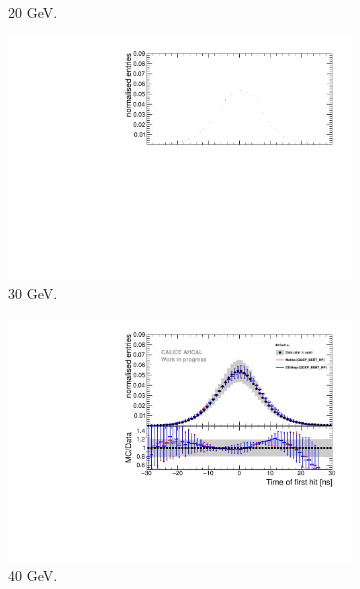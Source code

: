 \begin{figure}[htbp!]
\begin{subfigure}[t]{0.5\textwidth}
    \caption{20 GeV.}\label{fig:elec_sim_data_20GeV}
  \end{subfigure}
  \hfill
  \begin{subfigure}[t]{0.5\textwidth}
    \centering
    \includegraphics[width=1\textwidth]{../Thesis_Plots/Timing/Electrons/Plots/Comparison_SimData_Electrons30GeV.pdf}
    \caption{30 GeV.}\label{fig:elec_sim_data_30GeV}
  \end{subfigure}
  \hfill
  \begin{subfigure}[t]{0.5\textwidth}
    \centering
    \includegraphics[width=1\textwidth]{../Thesis_Plots/Timing/Electrons/Plots/Comparison_SimData_Electrons40GeV.pdf}
    \caption{40 GeV.}\label{fig:elec_sim_data_40GeV}
  \end{subfigure}
  \hfill
  \begin{subfigure}[t]{0.5\textwidth}

\end{subfigure}
\end{figure}
